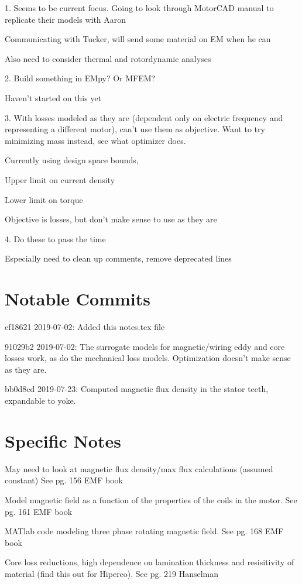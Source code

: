 \documentclass[10pt]{article}
\begin{document}
1. 
Seems to be current focus.
Going to look through MotorCAD manual to replicate their models with Aaron

Communicating with Tucker, will send some material on EM when he can

Also need to consider thermal and rotordynamic analyses

2.
Build something in EMpy?
Or MFEM?

Haven't started on this yet


3.
With losses modeled as they are (dependent only on electric frequency and representing a different motor), can't use them as objective.
Want to try minimizing mass instead, see what optimizer does.

Currently using design space bounds,

Upper limit on current density 

Lower limit on torque 

Objective is losses, but don't make sense to use as they are

4. 
Do these to pass the time

Especially need to clean up comments, remove deprecated lines




\section{Notable Commits}

ef18621 2019-07-02: Added this notes.tex file

91029b2 2019-07-02: The surrogate models for magnetic/wiring eddy and core losses work, as do the mechanical loss models. Optimization doesn't make sense as they are.

bb0d8cd 2019-07-23: Computed magnetic flux density in the stator teeth, expandable to yoke.

\section{Specific Notes}

May need to look at magnetic flux density/max flux calculations (assumed constant) See pg. 156 EMF book

Model magnetic field as a function of the properties of the coils in the motor. See pg. 161 EMF book

MATlab code modeling three phase rotating magnetic field. See pg. 168 EMF book

Core loss reductions, high dependence on lamination thickness and resisitivity of material (find this out for Hiperco). See pg. 219 Hanselman
\end{document}
